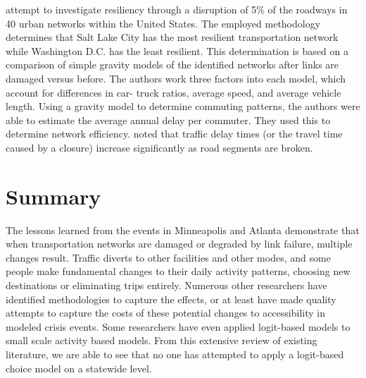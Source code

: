 \citet{ganin2017} attempt to investigate resiliency through a disruption
of 5\% of the roadways
in 40 urban networks within the United States. The employed methodology
determines that Salt Lake
City has the most resilient transportation network while Washington D.C.
has the least resilient.
This determination is based on a comparison of simple gravity models of the identified networks after links are
damaged versus before.
The authors work three factors into each model, which account for
differences in car-
truck ratios, average speed, and average vehicle length. Using a gravity
model to determine commuting patterns, the authors were
able to estimate the average
annual delay per commuter. They used this to determine network efficiency.
\citet{ganin2017} noted that
traffic delay times (or the travel time caused by a closure) increase
significantly as road segments are broken.

\section{Summary}

The lessons learned from the events in Minneapolis and Atlanta demonstrate
that when
transportation networks are damaged or degraded by link failure, multiple
changes result. Traffic
diverts to other facilities and other modes, and some people make
fundamental changes to their
daily activity patterns, choosing new destinations or eliminating trips
entirely. Numerous other
researchers have identified methodologies to capture the effects, or at
least have made quality attempts to capture the costs of these
potential changes to accessibility in modeled crisis events. Some researchers
have even applied logit-based models to small scale activity based models.
From this extensive review of existing literature, we are able to see that no
one has attempted to apply a logit-based choice model on a statewide level.
